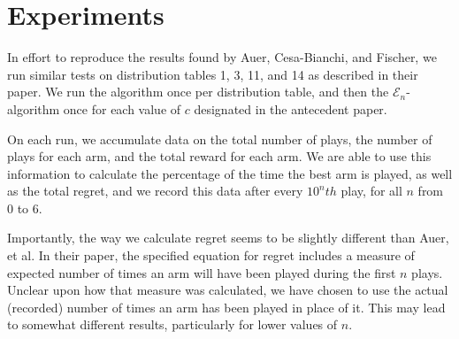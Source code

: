 
\section{Experiments}
\label{sec:expts}

In effort to reproduce the results found by Auer, Cesa-Bianchi, and Fischer,
we run similar tests on distribution tables 1, 3, 11, and 14 as described in their paper.
We run the  algorithm once per distribution table, and then
the $\mathcal{E}_n$- algorithm once for each value of $c$ designated
in the antecedent paper.

On each run, we accumulate data on the total number of plays, the number of plays
for each arm, and the total reward for each arm. We are able to use this information
to calculate the percentage of the time the best arm is played, as well as the total
regret, and we record this data after every $10^nth$ play, for all $n$ from 0 to 6.

Importantly, the way we calculate regret seems to be slightly different than Auer, et al.
In their paper, the specified equation for regret includes a measure of expected number
of times an arm will have been played during the first $n$ plays. Unclear upon how that
measure was calculated, we have chosen to use the actual (recorded) number of times
an arm has been played in place of it. This may lead to somewhat different results, particularly
for lower values of $n$.